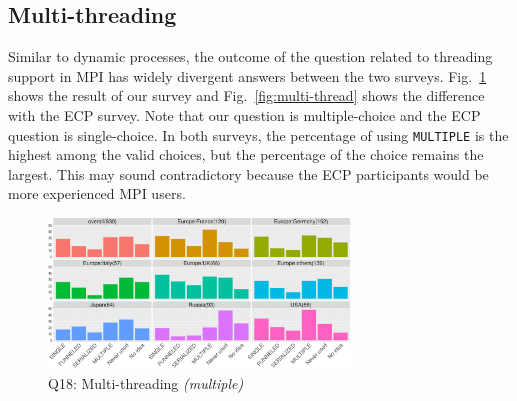 \documentclass[preprint,5p,times]{elsarticle}
\def\myquote#1{{\it #1}}
\newcommand{\revision}[2]{{\color{blue}#2}}
\begin{document}

\subsection{Multi-threading}\label{sec:mutil-threading}

Similar to dynamic processes, the outcome of the question related to threading
support in MPI has widely divergent answers between the two surveys.
Fig.~\ref{fig:multi-thread-reg} shows the result of our survey and
Fig.~\ref{fig:multi-thread} shows the difference with the ECP survey. Note that
our question is multiple-choice and the ECP question is single-choice. In both
surveys, the percentage of using {\tt MULTIPLE} is the highest among the valid
choices, but the percentage of the choice \revision{\myquote{I don't know}}{\myquote{No idea}} remains the
largest. This may sound contradictory because the ECP participants would be more
experienced MPI users.

\begin{figure}[tb]
  \begin{center}
    \includegraphics[width=8.0cm]{R-scripts/Q18.pdf}
    \vspace{-2mm}
    \caption{Q18: Multi-threading {\it(multiple)}}
    \label{fig:multi-thread-reg}
  \end{center}
\end{figure}
\end{document}
